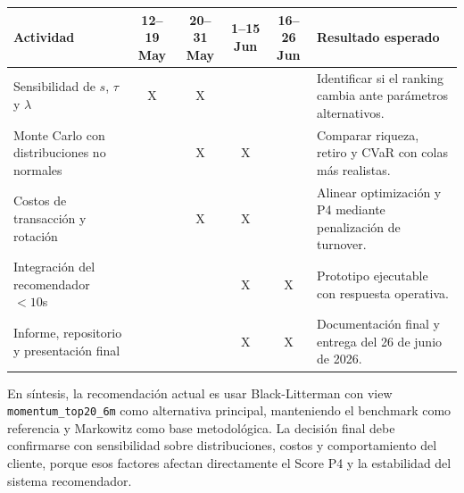 \begin{center}
\scriptsize
\setlength{\tabcolsep}{3pt}
\renewcommand{\arraystretch}{1.05}
\begin{tabular}{@{}p{}ccccp{}@{}}
\toprule
\textbf{Actividad} & \textbf{12--19 May} & \textbf{20--31 May} & \textbf{1--15 Jun} & \textbf{16--26 Jun} & \textbf{Resultado esperado} \\
\midrule
Sensibilidad de $s$, $\tau$ y $\lambda$ & X & X &  &  & Identificar si el ranking cambia ante par\'ametros alternativos. \\
Monte Carlo con distribuciones no normales &  & X & X &  & Comparar riqueza, retiro y CVaR con colas m\'as realistas. \\
Costos de transacci\'on y rotaci\'on &  & X & X &  & Alinear optimizaci\'on y P4 mediante penalizaci\'on de turnover. \\
Integraci\'on del recomendador $<10$s &  &  & X & X & Prototipo ejecutable con respuesta operativa. \\
Informe, repositorio y presentaci\'on final &  &  & X & X & Documentaci\'on final y entrega del 26 de junio de 2026. \\
\bottomrule
\end{tabular}
\end{center}

En s\'intesis, la recomendaci\'on actual es usar Black-Litterman con view \texttt{momentum\_top20\_6m} como alternativa principal, manteniendo el benchmark como referencia y Markowitz como base metodol\'ogica. La decisi\'on final debe confirmarse con sensibilidad sobre distribuciones, costos y comportamiento del cliente, porque esos factores afectan directamente el Score P4 y la estabilidad del sistema recomendador.
